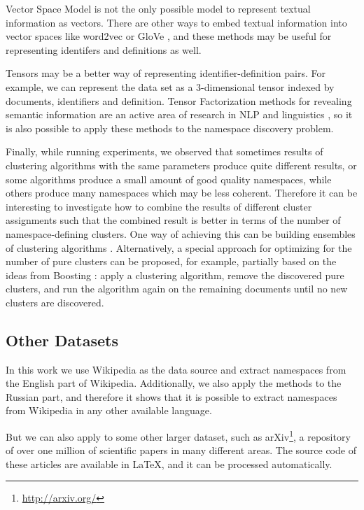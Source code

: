 Vector Space Model is not the only possible model to represent textual
information as vectors. There are other ways to embed textual information
into vector spaces like word2vec \cite{mikolov2013efficient} or
GloVe \cite{pennington2014glove}, and these methods may be useful
for representing identifers and definitions as well.

Tensors may be a better way of representing
identifier-definition pairs. For example, we can represent the data set
as a 3-dimensional tensor indexed by documents, identifiers and definition.
Tensor Factorization methods for revealing semantic information
are an active area of research in NLP and linguistics \cite{anisimov2014semantic},
so it is also possible to apply these methods to the namespace discovery problem.

Finally, while running experiments, we observed that sometimes results of
clustering algorithms with the same parameters produce quite different
results, or some algorithms produce a small amount of good quality namespaces,
while others produce many namespaces which may be less coherent.
Therefore it can be interesting to investigate how to combine the results
of different cluster assignments such that the combined result is better
in terms of the number of namespace-defining clusters. One way of
achieving this can be building ensembles of clustering algorithms \cite{strehl2003cluster}.
Alternatively, a special approach for optimizing for the number of pure clusters
can be proposed, for example, partially based on the ideas from
Boosting \cite{freund1996experiments}: apply a clustering algorithm,
remove the discovered pure clusters, and run the algorithm again on the remaining
documents until no new clusters are discovered.


\subsection{Other Datasets} %

In this work we use Wikipedia as the data source and extract namespaces from the
English part of Wikipedia. Additionally, we also apply the methods to the Russian
part, and therefore it shows that it is possible to extract namespaces from
Wikipedia in any other available language.

But we can also apply to some other larger dataset, such as arXiv\footnote{\url{http://arxiv.org/}}, a repository of over one million
of scientific papers in many different areas. The source code of these
articles are available in \LaTeX, and it can be processed automatically.

